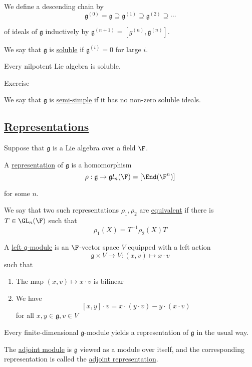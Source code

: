\documentclass[x11names,reqno,14pt]{extarticle}
\newcommand{\mk}[1]{\mathfrak{#1}}
\newcommand{\g}{\mk{g}}
\begin{document}

We define a descending chain by 
\[
\g^{(0)} = \g \supseteq \g^{(1)} \supseteq \g^{(2)} \supseteq \cdots
\]

of ideals of $\g$ inductively by $\g^{(n + 1)} = [g^{(n)}, \g^{(n)}]$. 


We say that $\g$ is \underline{soluble} if $\g^{(i)} = 0$ for large $i$. 

\prop

Every nilpotent Lie algebra is soluble. 

\proof

Exercise


We say that $\g$ is \underline{semi-simple} if it has no non-zero soluble ideals. 

\subsection*{\underline{Representations}}

Suppose that $\g$ is a Lie algebra over a field $\F$. 


A \underline{representation} of $\g$ is a homomorphism 
\[
\rho:\g\to\g l_n(\F) = [\End(\F^n)]
\]

for some $n$.

We say that two such representations $\rho_1, \rho_2$ are \underline{equivalent} if there is $T \in \GL_n(\F)$ such that
\[
\rho_1(X) = T^{-1}\rho_2(X)T
\]


A \underline{left $\g$-module} is an $\F$-vector space $V$ equipped with a left action 
\[
\g\times V \to V: (x, v) \mapsto x\cdot v
\]
such that
\begin{enumerate}

\item The map $(x, v) \mapsto x\cdot v$ is bilinear

\item We have
\[
[x,y]\cdot v = x\cdot(y\cdot v) - y\cdot(x\cdot v)
\]
for all $x, y \in \g, v \in V$

\end{enumerate}

Every finite-dimensional $\g$-module yields a representation of $\g$ in the usual way. 


The \underline{adjoint module} is $\g$ viewed as a module over itself, and the corresponding representation is called the \underline{adjoint representation}. 
\end{document}
